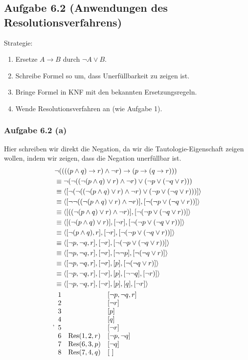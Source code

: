 \subsection{Aufgabe 6.2 (Anwendungen des Resolutionsverfahrens)}
Strategie:
\begin{enumerate}
	\item Ersetze $A\to B$ durch $\neg A\vee B$.
	\item Schreibe Formel so um, dass Unerfüllbarkeit zu zeigen ist.
	\item Bringe Formel in KNF mit den bekannten Ersetzungsregeln.
	\item Wende Resolutionsverfahren an (wie Aufgabe 1).
\end{enumerate}

\subsubsection{Aufgabe 6.2 (a)}
Hier schreiben wir direkt die Negation, da wir die Tautologie-Eigenschaft zeigen wollen, indem wir zeigen, dass die Negation unerfüllbar ist.
\begin{align*}
	&\neg((((p\wedge q)\to r)\wedge\neg r)\to(p\to(q\to r)))\\
	&\equiv
	\neg(\neg((\neg(p\wedge q)\vee r)\wedge\neg r)\vee(\neg p\vee(\neg q\vee r)))\\
	&\equiv
	\langle[\neg(\neg((\neg(p\wedge q)\vee r)\wedge\neg r)\vee(\neg p\vee(\neg q\vee r)))]\rangle\\
	&\equiv
	\langle[\neg\neg((\neg(p\wedge q)\vee r)\wedge\neg r)],[\neg(\neg p\vee(\neg q\vee r))]\rangle\\
	&\equiv
	\langle[((\neg(p\wedge q)\vee r)\wedge\neg r)],[\neg(\neg p\vee(\neg q\vee r))]\rangle\\
	&\equiv
	\langle[(\neg(p\wedge q)\vee r)],[\neg r],[\neg(\neg p\vee(\neg q\vee r))]\rangle\\
	&\equiv
	\langle[\neg(p\wedge q), r],[\neg r],[\neg(\neg p\vee(\neg q\vee r))]\rangle\\
	&\equiv
	\langle[\neg p,\neg q, r],[\neg r],[\neg(\neg p\vee(\neg q\vee r))]\rangle\\
	&\equiv
	\langle[\neg p,\neg q, r],[\neg r],[\neg\neg p],[\neg(\neg q\vee r)]\rangle\\
	&\equiv
	\langle[\neg p,\neg q, r],[\neg r],[p],[\neg(\neg q\vee r)]\rangle\\
	&\equiv
	\langle[\neg p,\neg q, r],[\neg r],[p],[\neg\neg q],[\neg r)]\rangle\\
	&\equiv
	\langle[\neg p,\neg q, r],[\neg r],[p],[q],[\neg r]\rangle\\,
	&\begin{array}{rll}
		1 &&[\neg p,\neg q,r]\\
		2 &&[\neg r]\\
		3 &&[p]\\
		4 &&[q]\\
		5 &&[\neg r]\\
		6 & \operatorname{Res}(1,2,r) & [\neg p,\neg q]\\
		7 & \operatorname{Res}(6,3,p) & [\neg q]\\
		8 & \operatorname{Res}(7,4,q) & [~]
	\end{array}
\end{align*}
